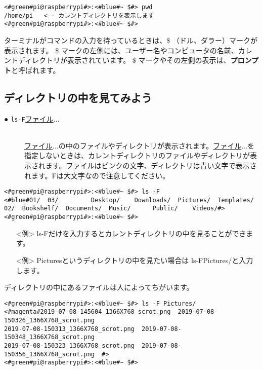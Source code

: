 \begin{lstlisting}[caption=pwdコマンドの例,label=pwdtest]
<#green#pi@raspberrypi#>:<#blue#~ $#> pwd
/home/pi   <-- カレントディレクトリを表示します
<#green#pi@raspberrypi#>:<#blue#~ $#>
\end{lstlisting}

ターミナルがコマンドの入力を待っているときは、\$ （ドル、ダラー）マークが表示されます。
\$ マークの左側には、ユーザー名やコンピュータの名前、カレントディレクトリが表示されています。
\$ マークやその左側の表示は、{\bf プロンプト}と呼ばれます。

\subsection{ディレクトリの中を見てみよう}
\begin{description}
\item[● \texttt{ls}\textvisiblespace \texttt{-F}\textvisiblespace \underline{ファイル}$\ldots$]\mbox{}\\
\underline{ファイル}$\ldots$の中のファイルやディレクトリが表示されます。\underline{ファイル}$\ldots$を指定しないときは、カレントディレクトリのファイルやディレクトリが表示されます。ファイルはピンクの文字、ディレクトリは青い文字で表示されます。Fは大文字なので注意してください。
\end{description}

\begin{minipage}{\linewidth}
\begin{lstlisting}[caption=ls -F コマンドの例。ファイルやディレクトリが表示されます,label=lsFtest]
<#green#pi@raspberrypi#>:<#blue#~ $#> ls -F
<#blue#01/  03/         Desktop/    Downloads/  Pictures/  Templates/
02/  Bookshelf/  Documents/  Music/      Public/    Videos/#>
<#green#pi@raspberrypi#>:<#blue#~ $#>
\end{lstlisting}
\end{minipage}

\begin{itemize}
\item[<例>] ls\textvisiblespace -Fだけを入力するとカレントディレクトリの中を見ることができます。 
\item[<例>] Picturesというディレクトリの中を見たい場合は ls\textvisiblespace -F\textvisiblespace Pictures/と入力します。 
\end{itemize}

ディレクトリの中にあるファイルは人によってちがいます。
\begin{lstlisting}[caption=ls -F Pictures/コマンドの例,label=lsFPicttest]
<#green#pi@raspberrypi#>:<#blue#~ $#> ls -F Pictures/
<#magenta#2019-07-08-145604_1366X768_scrot.png  2019-07-08-150326_1366X768_scrot.png  
2019-07-08-150313_1366X768_scrot.png  2019-07-08-150348_1366X768_scrot.png  
2019-07-08-150323_1366X768_scrot.png  2019-07-08-150356_1366X768_scrot.png  #>
<#green#pi@raspberrypi#>:<#blue#~ $#> 
\end{lstlisting}

